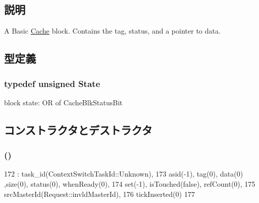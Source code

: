 \subsection{説明}
A Basic \hyperlink{classCache}{Cache} block. Contains the tag, status, and a pointer to data. 

\subsection{型定義}
\hypertarget{classCacheBlk_a09dbc3a4ce615f45c897d9ee6fbffb2a}{
\subsubsection[{State}]{\setlength{\rightskip}{0pt plus 5cm}typedef unsigned {\bf State}}}
\label{classCacheBlk_a09dbc3a4ce615f45c897d9ee6fbffb2a}
block state: OR of CacheBlkStatusBit 

\subsection{コンストラクタとデストラクタ}
\hypertarget{classCacheBlk_a59161d148bebfd16d76645bdb5c0546a}{
\subsubsection[{CacheBlk}]{ ()}}
\label{classCacheBlk_a59161d148bebfd16d76645bdb5c0546a}



\begin{DoxyCode}
172         : task_id(ContextSwitchTaskId::Unknown),
173           asid(-1), tag(0), data(0) ,size(0), status(0), whenReady(0),
174           set(-1), isTouched(false), refCount(0),
175           srcMasterId(Request::invldMasterId),
176           tickInserted(0)
177     {}
\end{DoxyCode}


